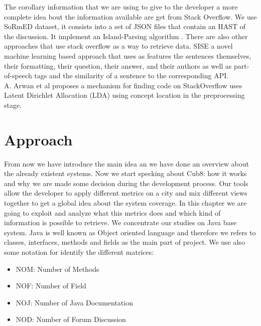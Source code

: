 \documentclass[]{usiinfbachelorproject}
\begin{document}
The corollary information that we are using to give to the developer a more complete idea bout the information available are get from Stack Overflow. We use SoRmED dataset, it consists into a set of JSON files that contain an HAST of the discussion. It implement an Island-Parsing algorithm \cite{stormy}. There are also other approaches that use stack overflow as a  way to retrieve data.
SISE \cite{SISE}  a novel machine learning based approach that uses as features the sentences themselves, their formatting, their question, their answer, and their authors as well as part-of-speech tags and the similarity of a sentence to the corresponding API.\\
A. Arwan et al \cite{7231439}  proposes a mechanism for finding code on StackOverflow uses Latent Dirichlet Allocation (LDA) using concept location in the preprocessing stage. 
 


\newpage
\section{Approach} \label{approach}

From now we have introduce the main idea an we have done an overview about the already existent systems. Now we start specking  about Cub8: how it works and why we are made some decision during the development process.
Our tools allow the developer to apply different metrics on a city and  mix different views together to get a global idea about the system coverage. In this chapter we are going to exploit and analyze what this metrics does and which kind of information is possible to retrieve. 
We concentrate our studies on Java base system. Java is well known as Object oriented language and therefore we refers to classes, interfaces, methods and fields as the main part of project.
We use also some notation for identify the different matrices: 
\begin{itemize}
\item NOM: Number of Methods
\item NOF: Number of Field
\item NOJ: Number of Java Documentation
\item NOD: Number of Forum Discussion

\end{itemize} 
\end{document}
